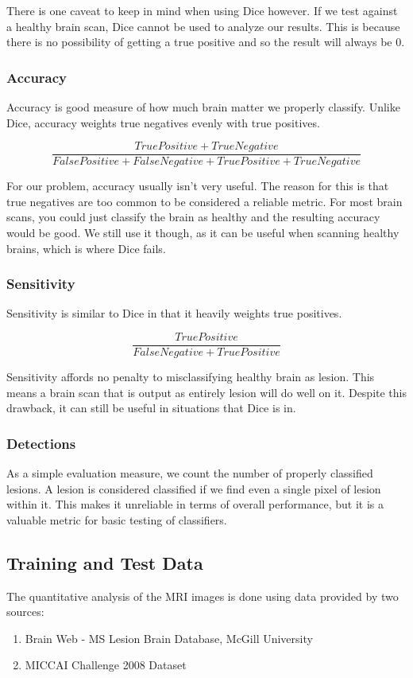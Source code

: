 \documentclass{article} %
\begin{document}
There is one caveat to keep in mind when using Dice however. If we test against a healthy brain scan, Dice cannot be used to analyze our results. This is because there is no possibility of getting a true positive and so the result will always be 0.

\subsubsection{Accuracy}
Accuracy is good measure of how much brain matter we properly classify. Unlike Dice, accuracy weights true negatives evenly with true positives.

$$\frac{True Positive + True Negative}{False Positive + False Negative + True Positive + True Negative}$$

For our problem, accuracy usually isn't very useful. The reason for this is that true negatives are too common to be considered a reliable metric. For most brain scans, you could just classify the brain as healthy and the resulting accuracy would be good. We still use it though, as it can be useful when scanning healthy brains, which is where Dice fails.

\subsubsection{Sensitivity}

Sensitivity is similar to Dice in that it heavily weights true positives.

$$\frac{True Positive}{False Negative + True Positive}$$

Sensitivity affords no penalty to misclassifying healthy brain as lesion. This means a brain scan that is output as entirely lesion will do well on it. Despite this drawback, it can still be useful in situations that Dice is in.

\subsubsection{Detections}

As a simple evaluation measure, we count the number of properly classified lesions. A lesion is considered classified if we find even a single pixel of lesion within it. This makes it unreliable in terms of overall performance, but it is a valuable metric for basic testing of classifiers.

\subsection{Training and Test Data}
The quantitative analysis of the MRI images is done using data provided by two sources:
\begin{enumerate}
\item Brain Web - MS Lesion Brain Database, McGill University
\item MICCAI Challenge 2008 Dataset
\end{enumerate}
\end{document}
